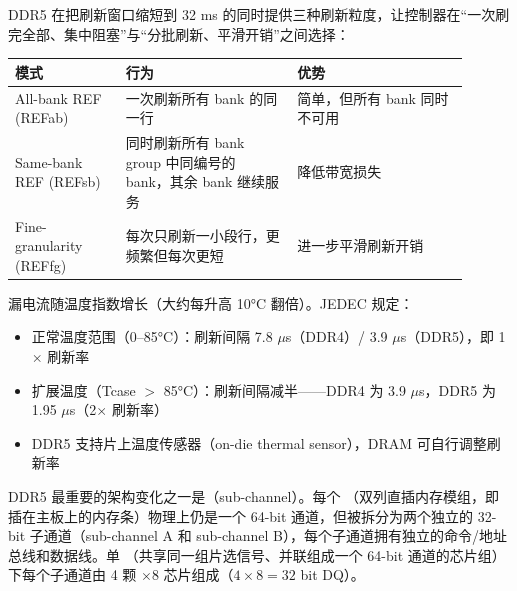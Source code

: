 
DDR5 在把刷新窗口缩短到 32 ms 的同时提供三种刷新粒度，让控制器在“一次刷完全部、集中阻塞”与“分批刷新、平滑开销”之间选择：

\begin{longtable}{L{0.22\linewidth}L{0.34\linewidth}L{0.34\linewidth}}
\toprule
模式 & 行为 & 优势 \\
\midrule
All-bank REF (REFab) & 一次刷新所有 bank 的同一行 & 简单，但所有 bank 同时不可用 \\
Same-bank REF (REFsb) & 同时刷新所有 bank group 中同编号的 bank，其余 bank 继续服务 & 降低带宽损失 \\
Fine-granularity (REFfg) & 每次只刷新一小段行，更频繁但每次更短 & 进一步平滑刷新开销 \\
\bottomrule
\end{longtable}


漏电流随温度指数增长（大约每升高 10°C 翻倍）。JEDEC 规定：
\begin{itemize}
  \item 正常温度范围（0--85°C）：刷新间隔 7.8 $\mu$s（DDR4）/ 3.9 $\mu$s（DDR5），即 1$\times$ 刷新率
  \item 扩展温度（Tcase $>$ 85°C）：刷新间隔减半——DDR4 为 3.9 $\mu$s，DDR5 为 1.95 $\mu$s（2$\times$ 刷新率）
  \item DDR5 支持片上温度传感器（on-die thermal sensor），DRAM 可自行调整刷新率
\end{itemize}



DDR5 最重要的架构变化之一是（sub-channel）。每个 （双列直插内存模组，即插在主板上的内存条）物理上仍是一个 64-bit 通道，但被拆分为两个独立的 32-bit 子通道（sub-channel A 和 sub-channel B），每个子通道拥有独立的命令/地址总线和数据线。单 （共享同一组片选信号、并联组成一个 64-bit 通道的芯片组）下每个子通道由 4 颗 $\times$8 芯片组成（$4 \times 8 = 32$ bit DQ）。

